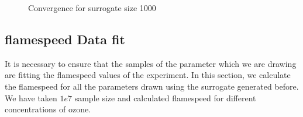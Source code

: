 \begin{figure}[H]
\centering
{}
    \caption{Convergence for surrogate size 1000}
\end{figure}


\subsection{flamespeed Data fit}

\noindent It is necessary to ensure that the samples of the parameter which we are drawing are fitting the flamespeed values of the experiment. In this section, we calculate the flamespeed for all the parameters drawn using the surrogate generated before. We have taken $1e7$ sample size and calculated flamespeed for different concentrations of ozone. 

